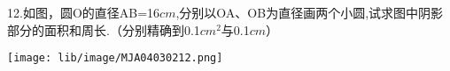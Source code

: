 12.如图，圆O的直径AB=16$cm$,分别以OA、OB为直径画两个小圆,试求图中阴影部分的面积和周长.（分别精确到0.1$cm^2$与0.1$cm$）

\begin{center}

    \texttt{[image: lib/image/MJA04030212.png]}

\end{center}




